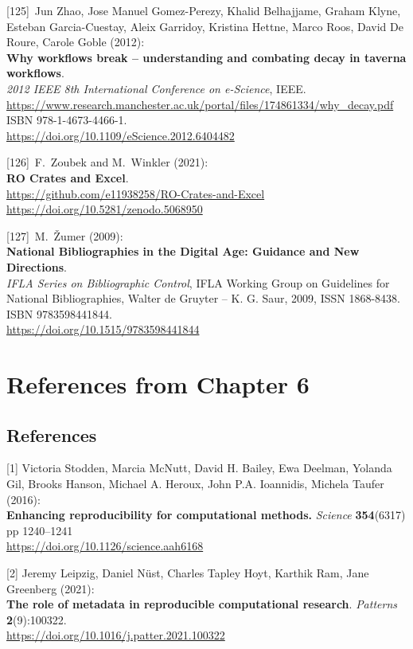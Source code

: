 {[}125{]}~Jun Zhao, Jose Manuel Gomez-Perezy, Khalid Belhajjame, Graham
Klyne, Esteban Garcia-Cuestay, Aleix Garridoy, Kristina Hettne, Marco
Roos, David De Roure, Carole Goble (2012):\\
\textbf{Why workflows break -- understanding and combating decay in
taverna workflows}.\\
\emph{2012 IEEE 8th International Conference on e-Science}, IEEE.
\url{https://www.research.manchester.ac.uk/portal/files/174861334/why_decay.pdf}
ISBN 978-1-4673-4466-1.\\
\url{https://doi.org/10.1109/eScience.2012.6404482}

{[}126{]}~F.~Zoubek and M.~Winkler (2021):\\
\textbf{RO Crates and Excel}.\\
\url{https://github.com/e11938258/RO-Crates-and-Excel}
\url{https://doi.org/10.5281/zenodo.5068950}

{[}127{]}~M.~Žumer (2009):\\
\textbf{National Bibliographies in the Digital Age: Guidance and New
Directions}.\\
\emph{IFLA Series on Bibliographic Control}, IFLA Working Group on
Guidelines for National Bibliographies, Walter de Gruyter -- K. G. Saur,
2009, ISSN 1868-8438. ISBN 9783598441844.\\
\url{https://doi.org/10.1515/9783598441844}


\section{References from Chapter 6}


\hypertarget{references-3}{%
\subsection{References}\label{references-3}}

{[}1{]} Victoria Stodden, Marcia McNutt, David H. Bailey, Ewa Deelman,
Yolanda Gil, Brooks Hanson, Michael A. Heroux, John P.A. Ioannidis,
Michela Taufer (2016):\\
\textbf{Enhancing reproducibility for computational methods.}
\emph{Science} \textbf{354}(6317) pp 1240--1241\\
\url{https://doi.org/10.1126/science.aah6168}

{[}2{]} Jeremy Leipzig, Daniel Nüst, Charles Tapley Hoyt, Karthik Ram,
Jane Greenberg (2021):\\
\textbf{The role of metadata in reproducible computational research}.
\emph{Patterns} \textbf{2}(9):100322.\\
\url{https://doi.org/10.1016/j.patter.2021.100322}

